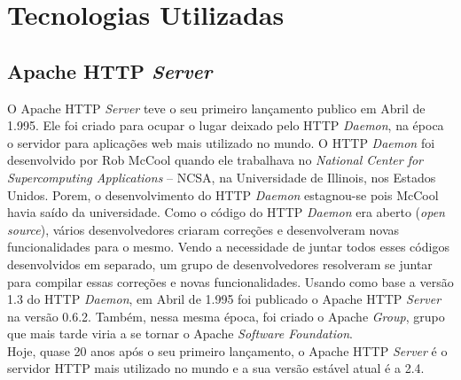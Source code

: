 \chapter{Tecnologias Utilizadas}\label{cap:tecnologias_utilizadas}
\section{Apache HTTP \textit{Server}}
O Apache HTTP \textit{Server} teve o seu primeiro lançamento publico em Abril de 1.995. Ele foi criado para ocupar o lugar deixado pelo HTTP \textit{Daemon}, na época o servidor para aplicações web mais utilizado no mundo. O HTTP \textit{Daemon} foi desenvolvido por Rob McCool quando ele trabalhava no \textit{National Center for Supercomputing Applications} – NCSA, na Universidade de Illinois, nos Estados Unidos. Porem, o desenvolvimento do HTTP \textit{Daemon} estagnou-se pois McCool havia saído da universidade. Como o código do HTTP \textit{Daemon} era aberto (\textit{open source}), vários desenvolvedores criaram correções e desenvolveram novas funcionalidades para o mesmo. Vendo a necessidade de juntar todos esses códigos desenvolvidos em separado, um grupo de desenvolvedores resolveram se juntar para compilar essas correções e novas funcionalidades. Usando como base a versão 1.3 do HTTP \textit{Daemon}, em Abril de 1.995 foi publicado o Apache HTTP \textit{Server} na versão 0.6.2. Também, nessa mesma época, foi criado o Apache \textit{Group}, grupo que mais tarde viria a se tornar o Apache \textit{Software Foundation}.\\
Hoje, quase 20 anos após o seu primeiro lançamento, o Apache HTTP \textit{Server} é o servidor HTTP mais utilizado no mundo e a sua versão estável atual é a 2.4.\\

